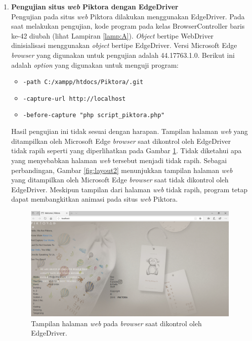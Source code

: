 \begin{enumerate}
\item \textbf{Pengujian situs \textit{web} Piktora dengan EdgeDriver}\\
Pengujian pada situs \textit{web} Piktora dilakukan menggunakan EdgeDriver. Pada saat melakukan pengujian, kode program pada kelas BrowserController baris ke-42  diubah (lihat Lampiran \ref{lamp:A}). \textit{Object} bertipe WebDriver dinisialisasi menggunakan \textit{object} bertipe EdgeDriver. Versi Microsoft Edge \textit{browser} yang digunakan untuk pengujian adalah 44.17763.1.0. Berikut ini adalah \textit{option} yang digunakan untuk menguji program:
\begin{itemize}
\item \texttt{-path C:/xampp/htdocs/Piktora/.git}
\item \texttt{-capture-url http://localhost}
\item \texttt{-before-capture "php script\_piktora.php"}
\end{itemize}
Hasil pengujian ini tidak sesuai dengan harapan. Tampilan halaman \textit{web} yang ditampilkan oleh Microsoft Edge \textit{browser} saat dikontrol oleh EdgeDriver tidak rapih seperti yang diperlihatkan pada Gambar \ref{fig:layout1}. Tidak diketahui apa yang menyebabkan halaman \textit{web} tersebut menjadi tidak rapih. Sebagai perbandingan, Gambar \ref{fig:layout2} menunjukkan tampilan halaman \textit{web} yang ditampilkan oleh Microsoft Edge \textit{browser} saat tidak dikontrol oleh EdgeDriver. Meskipun tampilan dari halaman \textit{web} tidak rapih, program tetap dapat membangkitkan animasi pada situs \textit{web} Piktora.    

\begin{figure}[H]
	\centering
		\includegraphics[scale=0.4]{Gambar/Layout_dengan_Edge_Driver.png}
	\caption{Tampilan halaman \textit{web} pada \textit{browser} saat dikontrol oleh EdgeDriver.}
	\label{fig:layout1}
\end{figure}


\end{enumerate}
